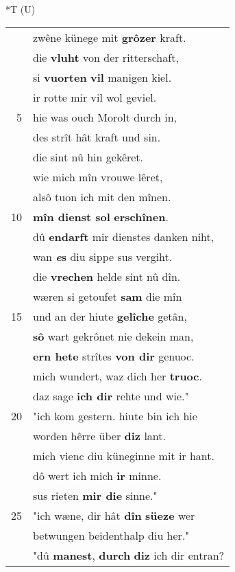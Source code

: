 \documentclass[8pt,a4paper,notitlepage]{article}
\begin{document}
\begin{table}[ht]
\begin{minipage}[t]{0.5\linewidth}
\end{minipage}
\hspace{0.5cm}
\begin{minipage}[t]{0.5\linewidth}
\small
\begin{center}*T (U)
\end{center}
\begin{tabular}{rl}
 & zwêne künege mit \textbf{grôzer} kraft.\\ 
 & die \textbf{vluht} von der ritterschaft,\\ 
 & si \textbf{vuorten} \textbf{vil} manigen kiel.\\ 
 & ir rotte mir vil wol geviel.\\ 
5 & hie was ouch Morolt durch in,\\ 
 & des strît hât kraft und sin.\\ 
 & die sint nû hin gekêret.\\ 
 & wie mich mîn vrouwe lêret,\\ 
 & alsô tuon ich mit den mînen.\\ 
10 & \textbf{mîn dienst sol} \textbf{erschînen}.\\ 
 & dû \textbf{en}\textbf{darft} mir dienstes danken niht,\\ 
 & wan \textbf{\textit{e}s} diu sippe sus vergiht.\\ 
 & die \textbf{vrechen} helde sint nû dîn.\\ 
 & wæren si getoufet \textbf{sam} die mîn\\ 
15 & und an der hiute \textbf{gelîche} getân,\\ 
 & \textbf{sô} wart gekrônet nie dekein man,\\ 
 & \textbf{ern hete} strîtes \textbf{von dir} genuoc.\\ 
 & mich wundert, waz dich her \textbf{truoc}.\\ 
 & daz sage \textbf{ich dir} rehte und wie."\\ 
20 & "ich kom gestern. hiute bin ich hie\\ 
 & worden hêrre über \textbf{diz} lant.\\ 
 & mich vienc diu küneginne mit ir hant.\\ 
 & dô wert ich mich \textbf{ir} minne.\\ 
 & sus rieten \textbf{mir die} sinne."\\ 
25 & "ich wæne, dir hât \textbf{dîn} \textbf{süeze} wer\\ 
 & betwungen beidenthalp diu her."\\ 
 & "dû \textbf{manest}, \textbf{durch} \textbf{diz} ich dir entran?\\ 

\end{tabular}
\end{minipage}
\end{table}
\end{document}
